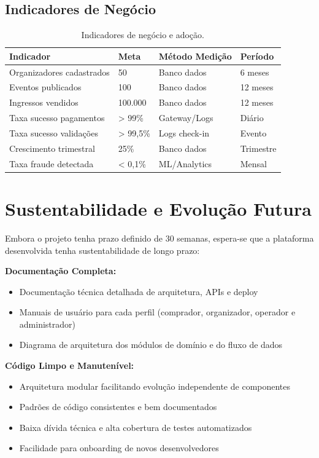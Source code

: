 \subsection{Indicadores de Negócio}

\begin{table}[H]
\centering
\caption{Indicadores de negócio e adoção.}%
\label{tab:kpi-negocio}
\small
\begin{tabular}{|p{5cm}|p{2.5cm}|p{3cm}|p{2cm}|}
\hline
\textbf{Indicador} & \textbf{Meta} & \textbf{Método Medição} & \textbf{Período} \\ \hline
Organizadores cadastrados & 50 & Banco dados & 6 meses \\ \hline
Eventos publicados & 100 & Banco dados & 12 meses \\ \hline
Ingressos vendidos & 100.000 & Banco dados & 12 meses \\ \hline
Taxa sucesso pagamentos & > 99\% & Gateway/Logs & Diário \\ \hline
Taxa sucesso validações & > 99,5\% & Logs check-in & Evento \\ \hline
Crescimento trimestral & 25\% & Banco dados & Trimestre \\ \hline
Taxa fraude detectada & < 0,1\% & ML/Analytics & Mensal \\ \hline
\end{tabular}
\end{table}

\section{Sustentabilidade e Evolução Futura}

Embora o projeto tenha prazo definido de 30 semanas, espera-se que a plataforma desenvolvida tenha sustentabilidade de longo prazo:

\textbf{Documentação Completa:}
\begin{itemize}
    \item Documentação técnica detalhada de arquitetura, APIs e deploy
    \item Manuais de usuário para cada perfil (comprador, organizador, operador e administrador)
    \item Diagrama de arquitetura dos módulos de domínio e do fluxo de dados
\end{itemize}

\textbf{Código Limpo e Manutenível:}
\begin{itemize}
    \item Arquitetura modular facilitando evolução independente de componentes
    \item Padrões de código consistentes e bem documentados
    \item Baixa dívida técnica e alta cobertura de testes automatizados
    \item Facilidade para onboarding de novos desenvolvedores
\end{itemize}

